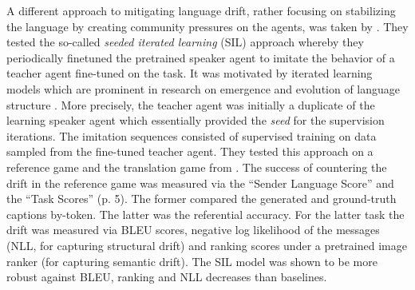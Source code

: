 A different approach to mitigating language drift, rather focusing on stabilizing the language by creating community pressures on the agents, was taken by \cite{lu2020countering}. They tested the so-called \textit{seeded iterated learning} (SIL) approach whereby they periodically finetuned the pretrained speaker agent to imitate the behavior of a teacher agent fine-tuned on the task. It was motivated by iterated learning models which are prominent in research on emergence and evolution of language structure \parencite{kirby2014iterated}. More precisely, the teacher agent was initially a duplicate of the learning speaker agent which essentially provided the \textit{seed} for the supervision iterations. The imitation sequences consisted of supervised training on data sampled from the fine-tuned teacher agent. They tested this approach on a reference game and the translation game from \cite{lee2019countering}. The success of countering the drift in the reference game was measured via the ``Sender Language Score'' and the ``Task Scores'' (p. 5). The former compared the generated and ground-truth captions by-token. The latter was the referential accuracy. %
For the latter task the drift was measured via BLEU scores, negative log likelihood of the messages (NLL, for capturing structural drift) and ranking scores under a pretrained image ranker (for capturing semantic drift). The SIL model was shown to be more robust against BLEU, ranking and NLL decreases than baselines.

